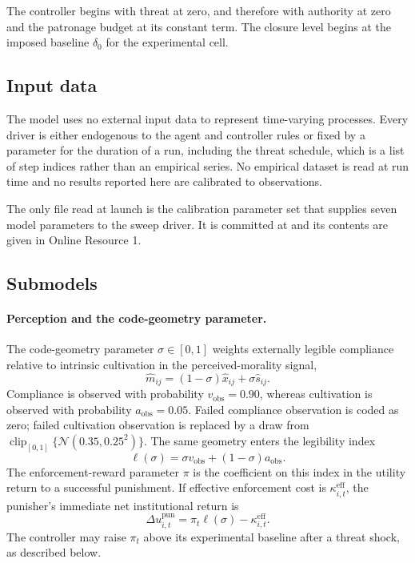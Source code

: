 \documentclass[12pt]{article}
\begin{document}
The controller begins with threat at zero, and therefore with authority at zero
and the patronage budget at its constant term. The closure level begins at the
imposed baseline \(\delta_0\) for the experimental cell.

\subsection{Input data}

The model uses no external input data to represent time-varying processes.
Every driver is either endogenous to the agent and controller rules or fixed by
a parameter for the duration of a run, including the threat schedule, which is a
list of step indices rather than an empirical series. No empirical dataset is
read at run time and no results reported here are calibrated to observations.

The only file read at launch is the calibration parameter set that supplies
seven model parameters to the sweep driver. It is committed at
 and its contents are given in Online
Resource 1.

\subsection{Submodels}

\paragraph{Perception and the code-geometry parameter.} The code-geometry
parameter \(\sigma\in[0,1]\) weights externally legible compliance relative to
intrinsic cultivation in the perceived-morality signal,
\begin{equation}
 \widehat m_{ij}=(1-\sigma)\widehat x_{ij}+\sigma\widehat s_{ij}.
\end{equation}
Compliance is observed with probability \(v_{\mathrm{obs}}=0.90\), whereas
cultivation is observed with probability \(a_{\mathrm{obs}}=0.05\). Failed
compliance observation is coded as zero; failed cultivation observation is
replaced by a draw from
\(\operatorname{clip}_{[0,1]}\{\mathcal{N}(0.35,0.25^2)\}\). The same geometry
enters the legibility index
\begin{equation}
 \ell(\sigma)=\sigma v_{\mathrm{obs}}+(1-\sigma)a_{\mathrm{obs}}.
\end{equation}
The enforcement-reward parameter \(\pi\) is the coefficient on this index in the
utility return to a successful punishment. If effective enforcement cost is
\(\kappa_{i,t}^{\mathrm{eff}}\), the punisher's immediate net institutional
return is
\begin{equation}
 \Delta u_{i,t}^{\mathrm{pun}}=\pi_t\ell(\sigma)-\kappa_{i,t}^{\mathrm{eff}}.
\end{equation}
The controller may raise \(\pi_t\) above its experimental baseline after a threat
shock, as described below.
\end{document}
